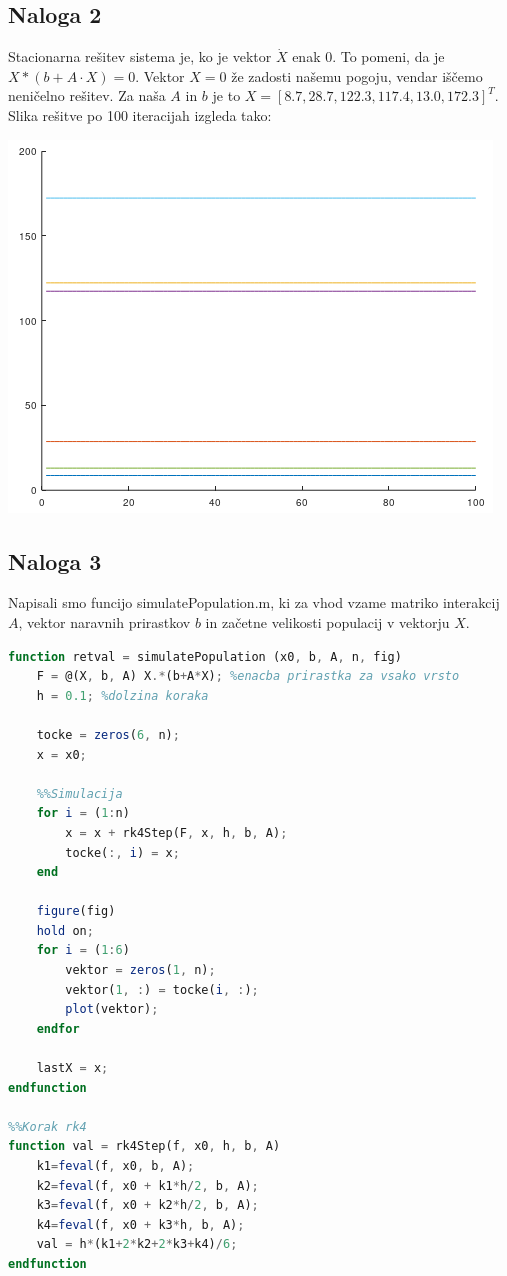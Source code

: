 \documentclass[a4paper, 12pt]{article}
\begin{document}
\subsection{Naloga 2}
Stacionarna rešitev sistema je, ko je vektor $ \dot X $ enak  $ 0 $. To pomeni, da je
$ X*(b+A\cdot X) = 0 $. Vektor $ X = 0 $ že zadosti našemu pogoju, vendar iščemo neničelno
rešitev. Za naša $ A $ in $ b $ je to $ X = \left[8.7, 28.7, 122.3, 117.4, 13.0, 172.3\right]^{T} $.
Slika rešitve po 100 iteracijah izgleda tako:\\
\begin{center}
	\includegraphics{stationary.png}
\end{center}

\subsection{Naloga 3}
Napisali smo funcijo {\sf simulatePopulation.m}, ki za vhod vzame matriko interakcij $ A $,
vektor naravnih prirastkov $ b $ in začetne velikosti populacij v vektorju $ X $.
\begin{lstlisting}[language=Octave]
function retval = simulatePopulation (x0, b, A, n, fig)
    F = @(X, b, A) X.*(b+A*X); %enacba prirastka za vsako vrsto
    h = 0.1; %dolzina koraka

    tocke = zeros(6, n);
    x = x0;

    %%Simulacija
    for i = (1:n)
        x = x + rk4Step(F, x, h, b, A);
        tocke(:, i) = x;
    end

    figure(fig)
    hold on;
    for i = (1:6)
        vektor = zeros(1, n);
        vektor(1, :) = tocke(i, :);
        plot(vektor);
    endfor

    lastX = x;
endfunction
  
%%Korak rk4
function val = rk4Step(f, x0, h, b, A)
    k1=feval(f, x0, b, A);
    k2=feval(f, x0 + k1*h/2, b, A);
    k3=feval(f, x0 + k2*h/2, b, A);
    k4=feval(f, x0 + k3*h, b, A);
    val = h*(k1+2*k2+2*k3+k4)/6;
endfunction
\end{lstlisting}
\end{document}
